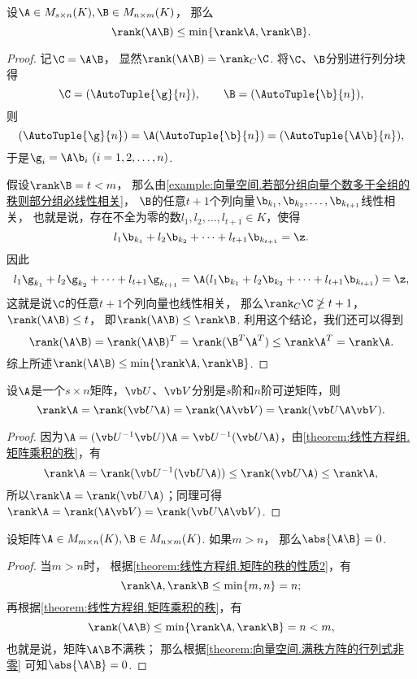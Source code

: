 \begin{theorem}\label{theorem:线性方程组.矩阵乘积的秩}
设\(\A\in M_{s\times n}(K),
\B\in M_{n\times m}(K)\)，
那么\[
	\rank(\A\B) \leq \min\{\rank\A,\rank\B\}.
\]
\begin{proof}
记\(\C = \A\B\)，
显然\(\rank(\A\B)=\rank_C\C\).
将\(\C\)、\(\B\)分别进行列分块得\[
	\C = (\AutoTuple{\g}{n}),
	\qquad
	\B = (\AutoTuple{\b}{n}),
\]
则\[
	(\AutoTuple{\g}{n}) = \A (\AutoTuple{\b}{n}) = (\AutoTuple{\A\b}{n}),
\]
于是\(\g_i = \A \b_i\ (i=1,2,\dotsc,n)\).

假设\(\rank\B = t<m\)，
那么由\cref{example:向量空间.若部分组向量个数多于全组的秩则部分组必线性相关}，
\(\B\)的任意\(t+1\)个列向量\(\b_{k_1},\b_{k_2},\dotsc,\b_{k_{t+1}}\)线性相关，
也就是说，存在不全为零的数\(l_1,l_2,\dotsc,l_{t+1}\in K\)，使得\[
	l_1 \b_{k_1} + l_2 \b_{k_2} + \dotsb + l_{t+1} \b_{k_{t+1}} = \z.
\]
因此\[
	l_1 \g_{k_1} + l_2 \g_{k_2} + \dotsb + l_{t+1} \g_{k_{t+1}}
	= \A(l_1 \b_{k_1} + l_2 \b_{k_2} + \dotsb + l_{t+1} \b_{k_{t+1}})
	= \z,
\]
这就是说\(\C\)的任意\(t+1\)个列向量也线性相关，
那么\(\rank_C\C \ngeq t+1\)，
\(\rank(\A\B)\leq t\)，
即\(\rank(\A\B) \leq \rank\B\).
利用这个结论，我们还可以得到\[
	\rank(\A\B)
	= \rank(\A\B)^T
	= \rank(\B^T \A^T)
	\leq \rank \A^T
	= \rank \A.
\]
综上所述\(\rank(\A\B) \leq \min\{\rank\A,\rank\B\}\).
\end{proof}
\end{theorem}

\begin{corollary}
设\(\A\)是一个\(s \times n\)矩阵，\(\P\)、\(\Q\)分别是\(s\)阶和\(n\)阶可逆矩阵，则\[
\rank\A = \rank(\P\A) = \rank(\A\Q) = \rank(\P\A\Q).
\]
\begin{proof}
因为\(\A = (\P^{-1} \P) \A = \P^{-1} (\P \A)\)，由\cref{theorem:线性方程组.矩阵乘积的秩}，有\[
\rank\A = \rank(\P^{-1}(\P\A)) \leq \rank(\P\A) \leq \rank\A,
\]所以\(\rank\A = \rank(\P\A)\)；同理可得\(\rank\A = \rank(\A\Q) = \rank(\P\A\Q)\).
\end{proof}
\end{corollary}

\begin{theorem}
设矩阵\(\A \in M_{m \times n}(K),
\B \in M_{n \times m}(K)\).
如果\(m > n\)，
那么\(\abs{\A\B} = 0\).
\begin{proof}
当\(m>n\)时，
根据\cref{theorem:线性方程组.矩阵的秩的性质2}，有\[
	\rank\A,\rank\B \leq \min\{m,n\} = n;
\]
再根据\cref{theorem:线性方程组.矩阵乘积的秩}，有\[
	\rank(\A\B) \leq \min\{\rank\A,\rank\B\} = n < m,
\]
也就是说，矩阵\(\A\B\)不满秩；
那么根据\cref{theorem:向量空间.满秩方阵的行列式非零} 可知\(\abs{\A\B} = 0\).
\end{proof}
\end{theorem}

